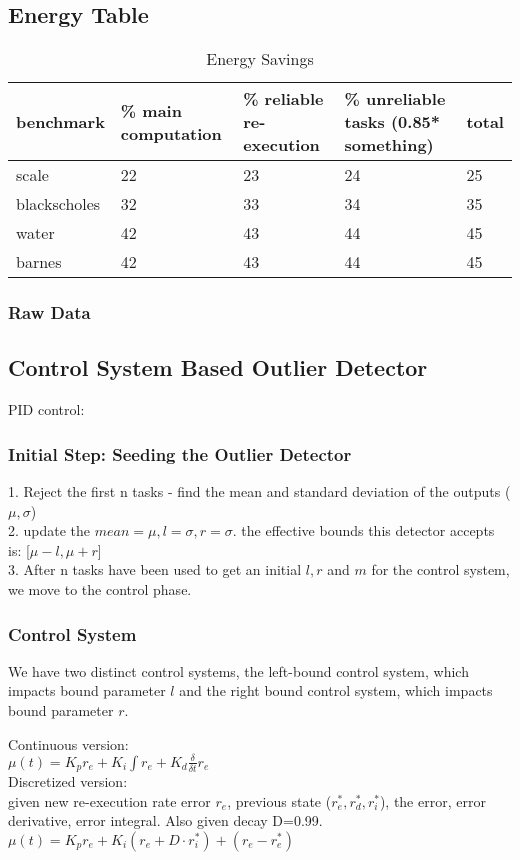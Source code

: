 \documentclass[11pt]{article}
\begin{document}
\subsection {Energy Table}
\begin{table*}[t]
\centering
\footnotesize
\begin{tabular}{l|llll}
	benchmark & \% main computation & \% reliable re-execution & \% unreliable tasks (0.85* something) & total\\
	\hline
	scale & 22 & 23 & 24 & 25\\
	blackscholes & 32 & 33 & 34 & 35\\
	water & 42 & 43 & 44 & 45\\
	barnes & 42 & 43 & 44 & 45 \\
\end{tabular}
\caption {Energy Savings}
\label{tbl:energy}
\end{table*}
\subsubsection {Raw Data}
\subsection {Control System Based Outlier Detector}
PID control:\\
\subsubsection {Initial Step: Seeding the Outlier Detector}
1. Reject the first n tasks - find the mean and standard deviation of the outputs ($\mu, \sigma$)\\
2. update the $mean=\mu,l=\sigma,r=\sigma$. the effective bounds this detector accepts is: [$\mu-l, \mu+r$]\\
3. After n tasks have been used to get an initial $l,r$ and $m$ for the control system, we move to the control phase.
\subsubsection {Control System}
We have two distinct control systems, the left-bound control system, which impacts bound parameter $l$ and the right bound control system, which impacts bound parameter $r$. 

Continuous version:\\
$\mu(t) = K_p r_e + K_i \int r_e + K_d \frac {\delta} {\delta t} r_e$\\
Discretized version:\\
given new re-execution rate error $r_e$, previous state ($r_e^*, r_d^*, r_i^*$), the error, error derivative, error integral. Also given decay D=0.99.\\
$\mu(t) = K_p r_e + K_i (r_e + D \cdot r_i^*) + (r_e - r_e^*)$\\
\end{document}
